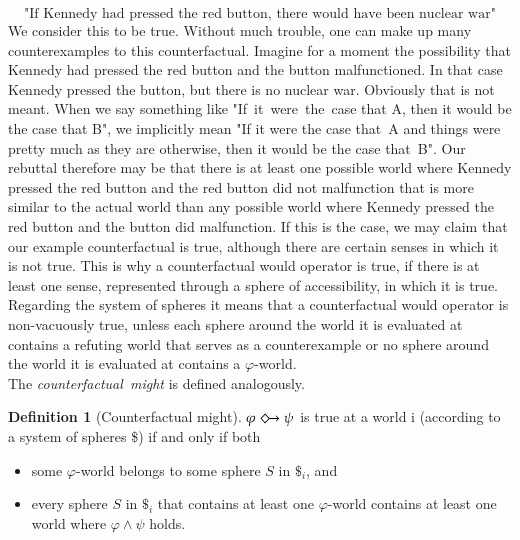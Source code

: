 \documentclass[a4paper,american,10pt]{paper}
\theoremstyle{definition}\newtheorem{definition}{Definition}
\begin{document}
\begin{equation}
\text{"If Kennedy had pressed the red button, there would have been nuclear war"}
\end{equation}
We consider this to be true. Without much trouble, one can make up many counterexamples to this counterfactual. Imagine for a moment the possibility that Kennedy had pressed the red button and the button malfunctioned. In that case Kennedy pressed the button, but there is no nuclear war. Obviously that is not meant. When we say something like "If~it~were~the~case that A, then it would be the case that B", we implicitly mean "If it were the case that~A and things were pretty much as they are otherwise, then it would be the case that~B". Our rebuttal therefore may be that there is at least one possible world where Kennedy pressed the red button and the red button did not malfunction that is more similar to the actual world than any possible world where Kennedy pressed the red button and the button did malfunction. If this is the case, we may claim that our example counterfactual is true, although there are certain senses in which it is not true. This is why a counterfactual would operator is true, if there is at least one sense, represented through a sphere of accessibility, in which it is true. Regarding the system of spheres it means that a counterfactual would operator is non-vacuously true, unless each sphere around the world it is evaluated at contains a refuting world that serves as a counterexample or no sphere around the world it is evaluated at contains a $\varphi$-world.\\
The \textit{counterfactual~might} is defined analogously.

\begin{definition}[Counterfactual might]
	$\varphi\Diamondright\psi$ is true at a world i (according to a system of spheres \$) if and only if both
	\begin{itemize}
	\item[(1)] some $\varphi$-world belongs to some sphere $S$ in $\$_i$, and
	\item[(2)] every sphere $S$ in $\$_i$ that contains at least one $\varphi$-world contains at least one world where $\varphi\wedge\psi$ holds.
	\end{itemize}
	\label{def:counterfactual_might}
\end{definition}
\end{document}
